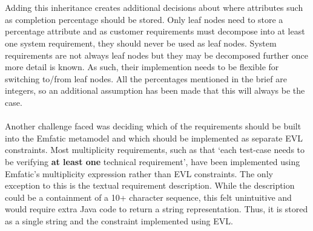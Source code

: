 \documentclass{article}
\begin{document}
\\\\
Adding this inheritance creates additional decisions about where attributes such as completion percentage should be stored. Only leaf nodes need to store a percentage attribute and as customer requirements must decompose into at least one system requirement, they should never be used as leaf nodes. System requirements are not always leaf nodes but they may be decomposed further once more detail is known. As such, their implemention needs to be flexible for switching to/from leaf nodes. All the percentages mentioned in the brief are integers, so an additional assumption has been made that this will always be the case.
\\\\
Another challenge faced was deciding which of the requirements should be built into the Emfatic metamodel and which should be implemented as separate EVL constraints. Most multiplicity requirements, such as that `each test-case needs to be verifying \textbf{at least one} technical requirement', have been implemented using Emfatic's multiplicity expression\cite{emfatic_lang} rather than EVL constraints. The only exception to this is the textual requirement description. While the description could be a containment of a 10+ character sequence, this felt unintuitive and would require extra Java code to return a string representation. Thus, it is stored as a single string and the constraint implemented using EVL.
\\\\
\end{document}
